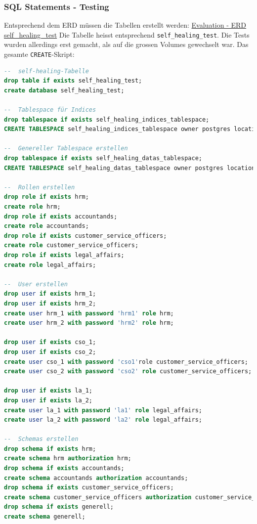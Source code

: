 \subsubsection{SQL Statements - Testing}
Entsprechend dem ERD müssen die Tabellen erstellt werden:
\hyperref[subsubsec:erd_self_healing_test]{Evaluation - ERD self\_healing\_test}
Die Tabelle heisst entsprechend \texttt{self\_healing\_test}.
Die Tests wurden allerdings erst gemacht, als auf die grossen Volumes gewechselt war.
Das gesamte \texttt{CREATE}-Skript:
\lstset{style=gra_codestyle}
\begin{lstlisting}[language=sql, caption=Patroni - Self Healing Tests - CREATE-SQL,captionpos=b,label={lst:patroni-self-healing-create-sql},breaklines=true]
--  self-healing-Tabelle
drop table if exists self_healing_test;
create database self_healing_test;

--  Tablespace für Indices
drop tablespace if exists self_healing_indices_tablespace;
CREATE TABLESPACE self_healing_indices_tablespace owner postgres location '/srv/data/self_healing_test_index_tablespace';

--  Genereller Tablespace erstellen
drop tablespace if exists self_healing_datas_tablespace;
CREATE TABLESPACE self_healing_datas_tablespace owner postgres location '/srv/data/self_healing_test_data_tablespace';

--  Rollen erstellen
drop role if exists hrm;
create role hrm;
drop role if exists accountands;
create role accountands;
drop role if exists customer_service_officers;
create role customer_service_officers;
drop role if exists legal_affairs;
create role legal_affairs;

--  User erstellen
drop user if exists hrm_1;
drop user if exists hrm_2;
create user hrm_1 with password 'hrm1' role hrm;
create user hrm_2 with password 'hrm2' role hrm;

drop user if exists cso_1;
drop user if exists cso_2;
create user cso_1 with password 'cso1'role customer_service_officers;
create user cso_2 with password 'cso2' role customer_service_officers;

drop user if exists la_1;
drop user if exists la_2;
create user la_1 with password 'la1' role legal_affairs;
create user la_2 with password 'la2' role legal_affairs;

--  Schemas erstellen
drop schema if exists hrm;
create schema hrm authorization hrm;
drop schema if exists accountands;
create schema accountands authorization accountands;
drop schema if exists customer_service_officers;
create schema customer_service_officers authorization customer_service_officers;
drop schema if exists generell;
create schema generell;


\end{lstlisting}
